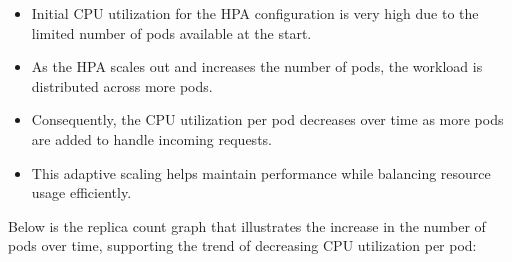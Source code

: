 \begin{itemize}
    \item Initial CPU utilization for the HPA configuration is very high due to the limited number of pods available at the start.
    \item As the HPA scales out and increases the number of pods, the workload is distributed across more pods.
    \item Consequently, the CPU utilization per pod decreases over time as more pods are added to handle incoming requests.
    \item This adaptive scaling helps maintain performance while balancing resource usage efficiently.
\end{itemize}

\noindent Below is the replica count graph that illustrates the increase in the number of pods over time, supporting the trend of decreasing CPU utilization per pod:


